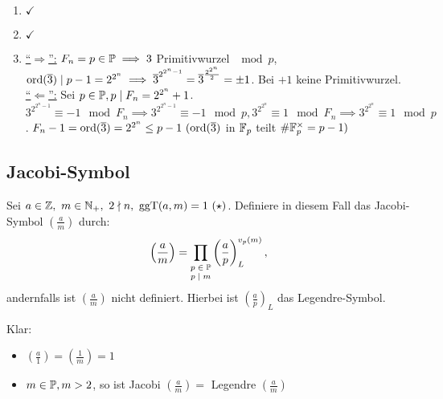 \documentclass[a4paper,DIV15,BCOR12mm]{article}
\begin{document}
\begin{beweis}
    \begin{enumerate}
        \item $\checkmark$
        \item $\checkmark$
        \item \underline{"`$\Longrightarrow$"':} $F_n = p \in \mathbb{P} \implies 3$ Primitivwurzel
        $\mod p$, $\mathop{\rm ord}\nolimits(\overline 3) \mid p-1 = 2^{2^n} \implies \overline 3^{2^{2^n-1}}
        = \overline 3^{\frac{2^{2^n}}{2}} = \pm 1$. Bei $+1$ keine Primitivwurzel.\\
        \underline{"`$\Longleftarrow$"':} Sei $p \in \mathbb{P}, p \mid F_n = 2^{2^n} + 1$.
        $3^{2^{2^n-1}} \equiv -1 \mod F_n \implies 3^{2^{2^n-1}} \equiv -1 \mod p,
         3^{2^{2^n}} \equiv 1 \mod F_n \implies 3^{2^{2^n}} \equiv 1 \mod p$.
         $F_n -1 = \ord(\overline 3) = 2^{2^n} \le p-1\ (\ord(\overline 3) $ in $\mathbb{F}_p$
         teilt ${\#\mathbb{F}_p^\times = p-1)}$
    \end{enumerate}
\end{beweis}

\subsection{Jacobi-Symbol}
\begin{definition}
    Sei $a \in \mathbb{Z},\ m \in \mathbb{N}_+,\ 2 \nmid n,\ \mathop{\rm ggT}\nolimits(a,m) = 1\ (\star)$. Definiere in diesem
    Fall das Jacobi-Symbol $\left(\frac{a}{m}\right)$ durch:
    \[
        \left(\frac{a}{m}\right) = \prod_{\scriptsize\begin{matrix}p\in \mathbb{P}\\p
        \mid m\end{matrix}} \left(\frac{a}{p}\right)_L^{v_p(m)},
    \]
    andernfalls ist $\left(\frac{a}{m}\right)$ nicht definiert.
    Hierbei ist $\left(\frac a p\right)_L$ das Legendre-Symbol.

    Klar:
    \begin{itemize}
        \item[] $\left(\frac{a}{1}\right) = \left(\frac{1}{m}\right) = 1$
        \item[] $m \in \mathbb{P}, m > 2$, so ist Jacobi $\left(\frac{a}{m}\right) = $ Legendre $\left(\frac{a}{m}\right)$
    \end{itemize}
\end{definition}
\end{document}
